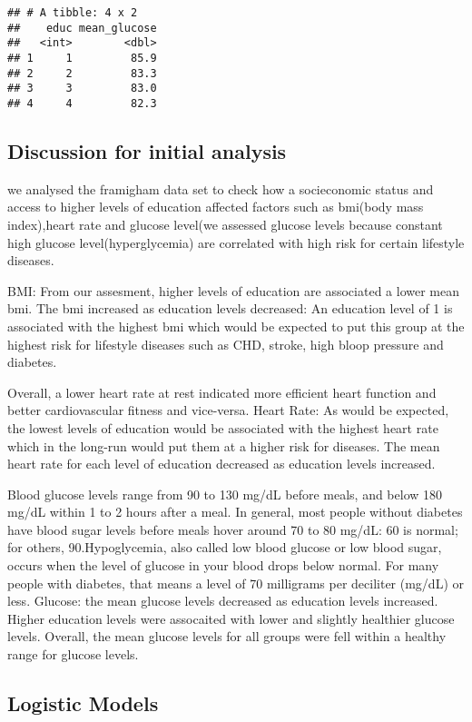 \documentclass[]{article}
\begin{document}
\begin{verbatim}
## # A tibble: 4 x 2
##    educ mean_glucose
##   <int>        <dbl>
## 1     1         85.9
## 2     2         83.3
## 3     3         83.0
## 4     4         82.3
\end{verbatim}

\subsection{Discussion for initial
analysis}\label{discussion-for-initial-analysis}

we analysed the framigham data set to check how a socieconomic status
and access to higher levels of education affected factors such as
bmi(body mass index),heart rate and glucose level(we assessed glucose
levels because constant high glucose level(hyperglycemia) are correlated
with high risk for certain lifestyle diseases.

BMI: From our assesment, higher levels of education are associated a
lower mean bmi. The bmi increased as education levels decreased: An
education level of 1 is associated with the highest bmi which would be
expected to put this group at the highest risk for lifestyle diseases
such as CHD, stroke, high bloop pressure and diabetes.

Overall, a lower heart rate at rest indicated more efficient heart
function and better cardiovascular fitness and vice-versa. Heart Rate:
As would be expected, the lowest levels of education would be associated
with the highest heart rate which in the long-run would put them at a
higher risk for diseases. The mean heart rate for each level of
education decreased as education levels increased.

Blood glucose levels range from 90 to 130 mg/dL before meals, and below
180 mg/dL within 1 to 2 hours after a meal. In general, most people
without diabetes have blood sugar levels before meals hover around 70 to
80 mg/dL: 60 is normal; for others, 90.Hypoglycemia, also called low
blood glucose or low blood sugar, occurs when the level of glucose in
your blood drops below normal. For many people with diabetes, that means
a level of 70 milligrams per deciliter (mg/dL) or less. Glucose: the
mean glucose levels decreased as education levels increased. Higher
education levels were assocaited with lower and slightly healthier
glucose levels. Overall, the mean glucose levels for all groups were
fell within a healthy range for glucose levels.

\subsection{Logistic Models}\label{logistic-models}
\end{document}
